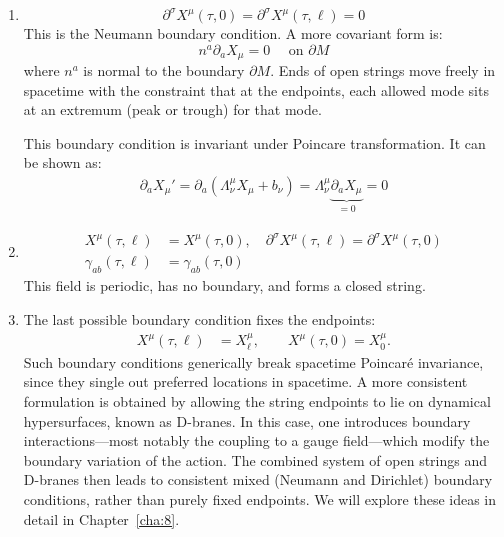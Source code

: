 \begin{enumerate}
	\item \begin{equation}
		\partial^{\sigma} X^{\mu}(\tau, 0)=\partial^{\sigma} X^{\mu}(\tau, \ell)=0 \label{Neumann-bound}
	\end{equation}
	This is the Neumann boundary condition. 
	A more covariant form is: 
	\begin{equation}
		n^{a} \partial_{a} X_{\mu}=0 \quad \text { on } \partial M
	\end{equation}
	where $n^a$ is normal to the boundary $\partial M$. Ends of open strings move freely in spacetime with the constraint that at the endpoints, each allowed mode sits at an extremum (peak or trough) for that mode.
	\begin{tcolorbox}
		\begin{remark}
			This boundary condition is invariant under Poincare transformation. It can be shown as:
			\begin{align*}
				\partial_{a}X_{\mu}'=\partial_{a} (\Lambda^{\mu}_{\nu}X_{\mu}+b_{\nu})= \Lambda^{\mu}_{\nu}\underbrace{\partial_{a}X_{\mu}}_{=0}=0
			\end{align*}
		\end{remark}
	\end{tcolorbox} 
	\item   
	\begin{subequations}
		\begin{align}
			X^{\mu}(\tau, \ell)&=X^{\mu}(\tau, 0), \quad \partial^{\sigma} X^{\mu}(\tau, \ell)=\partial^{\sigma} X^{\mu}(\tau, 0)\\
			\gamma_{a b}(\tau, \ell)&=\gamma_{a b}(\tau, 0)
		\end{align}
	\end{subequations}
	This field is periodic, has no boundary, and forms a closed string. 
	\item  The last possible boundary condition fixes the endpoints:
	\begin{subequations}
		\begin{align}
			X^{\mu}(\tau, \ell) &= X^{\mu}_{\ell}, \qquad
			X^{\mu}(\tau, 0) = X^{\mu}_{0}.
		\end{align}
	\end{subequations}
	Such boundary conditions generically break spacetime Poincar\'e invariance, since they single out preferred locations in spacetime. A more consistent formulation is obtained by allowing the string endpoints to lie on dynamical hypersurfaces, known as D-branes. In this case, one introduces boundary interactions—most notably the coupling to a gauge field—which modify the boundary variation of the action. The combined system of open strings and D-branes then leads to consistent mixed (Neumann and Dirichlet) boundary conditions, rather than purely fixed endpoints. We will explore these ideas in detail in Chapter~\ref{cha:8}.
\end{enumerate} 
